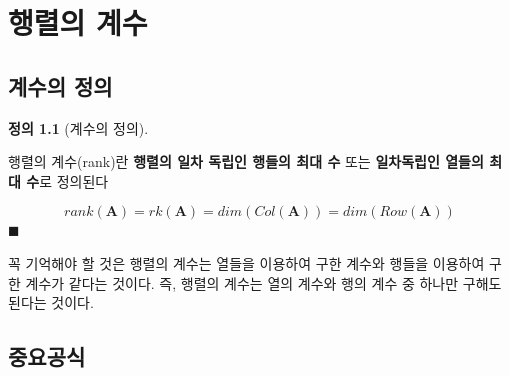 \documentclass[
  11pt,
  a4paper,
  oneside]{scrbook}
\theoremstyle{definition}
\newtheorem{definition}{정의}[chapter]
\theoremstyle{definition}
\theoremstyle{plain}
\theoremstyle{remark}
\begin{document}

\chapter{행렬의 계수}\label{matrix_rank}

\section{계수의 정의}\label{uxacc4uxc218uxc758-uxc815uxc758}

\begin{definition}[계수의
정의]\protect\hypertarget{def-rank}{}\label{def-rank}

행렬의 계수(rank)란 \textbf{행렬의 일차 독립인 행들의 최대 수} 또는
\textbf{일차독립인 열들의 최대 수}로 정의된다

\[ rank(\pmb A) = rk(\pmb A) = dim(Col(\pmb A)) = dim(Row(\pmb A)) \]
\(\blacksquare\)

\end{definition}

꼭 기억해야 할 것은 행렬의 계수는 열들을 이용하여 구한 계수와 행들을
이용하여 구한 계수가 같다는 것이다. 즉, 행렬의 계수는 열의 계수와 행의
계수 중 하나만 구해도 된다는 것이다.

\section{중요공식}\label{uxc911uxc694uxacf5uxc2dd}
\end{document}
